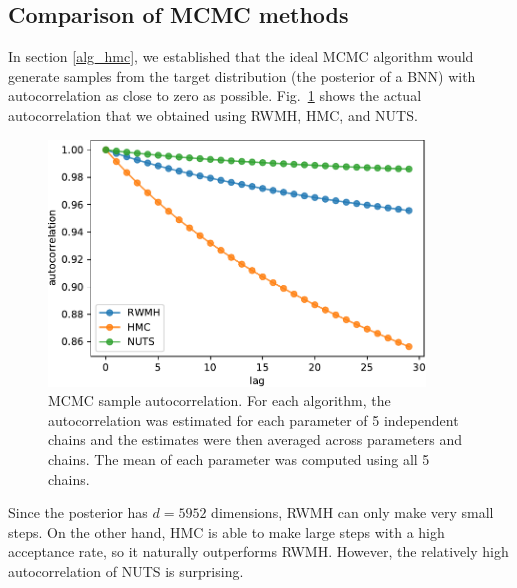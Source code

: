\documentclass[12pt]{article}
\begin{document}
\subsection{Comparison of MCMC methods}
\label{sec_comp_mcmc}

In section \ref{alg_hmc}, we established that the ideal MCMC algorithm would generate samples from the target distribution (the posterior of a BNN) with autocorrelation as close to zero as possible. Fig.\ \ref{fig_uci_param_autocor} shows the actual autocorrelation that we obtained using RWMH, HMC, and NUTS.

\begin{figure}[H]
\centering
\includegraphics[width=10cm]{plots/uci_param_autocor.pdf}
\caption{MCMC sample autocorrelation. For each algorithm, the autocorrelation was estimated for each parameter of 5 independent chains and the estimates were then averaged across parameters and chains. The mean of each parameter was computed using all 5 chains.}
\label{fig_uci_param_autocor}
\end{figure}

Since the posterior has $d=5952$ dimensions, RWMH can only make very small steps. On the other hand, HMC is able to make large steps with a high acceptance rate, so it naturally outperforms RWMH. However, the relatively high autocorrelation of NUTS is surprising.
\end{document}
